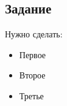 \subsection*{Задание}\label{sec:Task}

Нужно сделать:
\begin{itemize}
        \item Первое
        \item Второе
        \item Третье
\end{itemize}
\newpage

\newpage
